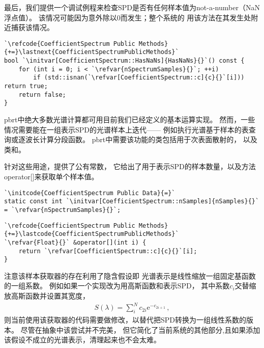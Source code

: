 最后，我们提供一个调试例程来检查SPD是否有任何样本值为not-a-number（NaN浮点值）。
该情况可能因为意外除以0而发生；整个系统的
用该方法在其发生处附近捕获该情况。
\begin{lstlisting}
`\refcode{CoefficientSpectrum Public Methods}{+=}\lastnext{CoefficientSpectrumPublicMethods}` 
bool `\initvar[CoefficientSpectrum::HasNaNs]{HasNaNs}{}`() const {
    for (int i = 0; i < `\refvar{nSpectrumSamples}{}`; ++i)
        if (std::isnan(`\refvar[CoefficientSpectrum::c]{c}{}`[i])) return true;
    return false;
}
\end{lstlisting}

pbrt中绝大多数光谱计算都可用目前我们已经定义的基本运算实现。
然而，一些情况需要能在一组表示SPD的光谱样本上迭代——
例如执行光谱基于样本的表查询或逐波长计算分段函数。
pbrt中需要该功能的类包括用于次表面散射的，
以及类和。

针对这些用途，提供了公有常数，
它给出了用于表示SPD的样本数量，以及方法{\ttfamily operator[]}来获取单个样本值。
\begin{lstlisting}
`\initcode{CoefficientSpectrum Public Data}{=}`
static const int `\initvar[CoefficientSpectrum::nSamples]{nSamples}{}` = `\refvar{nSpectrumSamples}{}`;
\end{lstlisting}
\begin{lstlisting}
`\refcode{CoefficientSpectrum Public Methods}{+=}\lastcode{CoefficientSpectrumPublicMethods}`
`\refvar{Float}{}` &operator[](int i) {
    return `\refvar[CoefficientSpectrum::c]{c}{}`[i];
}
\end{lstlisting}

注意该样本获取器的存在利用了隐含假设即
光谱表示是线性缩放一组固定基函数的一组系数。
例如如果一个实现改为用高斯函数和表示SPD，
其中系数$c_i$交替缩放高斯函数并设置其宽度，
\begin{align*}
    S(\lambda)=\sum\limits_i^N{c_{2i}\mathrm{e}^{-c_{2i+1}}}\, ,
\end{align*}
则当前使用该获取器的代码需要做修改，以替代把SPD转换为一组线性系数的版本。
尽管在抽象中该尝试并不完美，
但它简化了当前系统的其他部分,且如果添加该假设不成立的光谱表示，清理起来也不会太难。